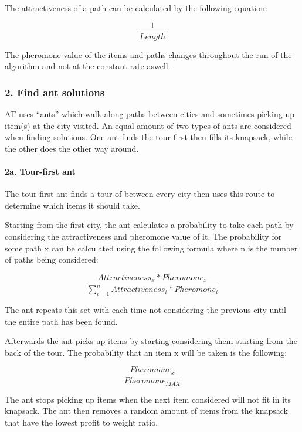 \documentclass[a4paper,12pt]{article}
\begin{document}
The attractiveness of a path can be calculated by the following equation:

\begin{equation}
\frac{1}{Length}
\end{equation}

The pheromone value of the items and paths changes throughout the run of the algorithm and not at the constant rate aswell.

\subsubsection*{2. Find ant solutions}

AT uses “ants” which walk along paths between cities and sometimes picking up item(s) at the city visited. An equal amount of two types of ants are considered when finding solutions. One ant finds the tour first then fills its knapsack, while the other does the other way around.

\paragraph*{2a. Tour-first ant}

The tour-first ant finds a tour of between every city then uses this route to determine which items it should take.

Starting from the first city, the ant calculates a probability to take each path by considering the attractiveness and pheromone value of it. The probability for some path x can be calculated using the following formula where n is the number of paths being considered:

\begin{equation}
\frac{Attractiveness_{x} * Pheromone_{x}}{\sum_{i = 1}^{n} Attractiveness_{i} * Pheromone_{i}}
\end{equation}

The ant repeats this set with each time not considering the previous city until the entire path has been found.

Afterwards the ant picks up items by starting considering them starting from the back of the tour. The probability that an item x will be taken is the following:

\begin{equation}
\frac{Pheromone_{x}}{Pheromone_{MAX}}
\end{equation}

The ant stops picking up items when the next item considered will not fit in its knapsack. The ant then removes a random amount of items from the knapsack that have the lowest profit to weight ratio.
\end{document}
